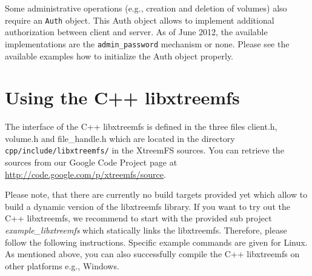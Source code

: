 \documentclass[a4paper,10pt]{book}
\begin{document}
Some administrative operations (e.g., creation and deletion of volumes) also require an \texttt{Auth} object. This Auth object allows to implement additional authorization between client and server. As of June 2012, the available implementations are the \texttt{admin\_password} mechanism or none. Please see the available examples how to initialize the Auth object properly.

\section{Using the C++ libxtreemfs}
\label{sec:libxtreemfs_cpp}

The interface of the C++ libxtreemfs is defined in the three files client.h, volume.h and file\_handle.h which are located in the directory \texttt{cpp/include/libxtreemfs/} in the XtreemFS sources. You can retrieve the sources from our Google Code Project page at \url{http://code.google.com/p/xtreemfs/source}.

Please note, that there are currently no build targets provided yet which allow to build a dynamic version of the libxtreemfs library. If you want to try out the C++ libxtreemfs, we recommend to start with the provided sub project \emph{example\_libxtreemfs} which statically links the libxtreemfs. Therefore, please follow the following instructions. Specific example commands are given for Linux. As mentioned above, you can also successfully compile the C++ libxtreemfs on other platforms e.g., Windows.
\end{document}
